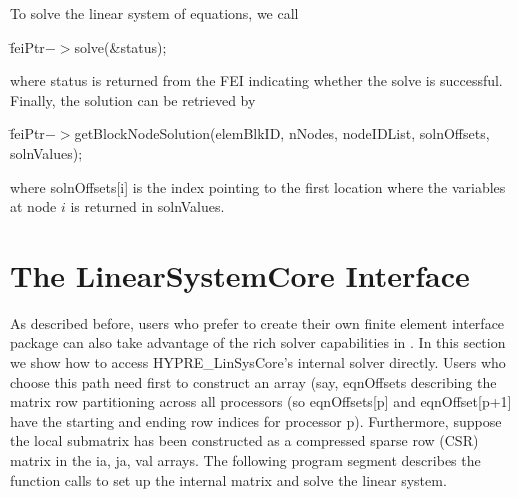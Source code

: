 To solve the linear system of equations, we call
\begin{tabbing}
\hspace{0.5in} \= {\sf feiPtr$->$solve(\&status);}
\end{tabbing}
where {\sf status} is returned from the {\sf FEI} indicating whether
the solve is successful. Finally, the solution can be retrieved by
\begin{tabbing}
\hspace{0.5in} \= {\sf feiPtr$->$getBlockNodeSolution(elemBlkID, nNodes, nodeIDList, solnOffsets, solnValues);}
\end{tabbing}
where {\sf solnOffsets[i]} is the index pointing to the first location 
where the variables at node $i$ is returned in {\sf solnValues}.

\section{The LinearSystemCore Interface}

As described before, users who prefer to create their own finite element
interface package can also take advantage of the rich solver capabilities
in \hypre{}. In this section we show how to access {\sf HYPRE\_LinSysCore}'s
internal solver directly.  Users who choose this path need first to 
construct an array (say, {\sf eqnOffsets} describing the matrix row
partitioning across all processors (so {\sf eqnOffsets[p]} and
{\sf eqnOffset[p+1]} have the starting and ending row indices for processor
p). Furthermore, suppose the local submatrix has been constructed as a
compressed sparse row (CSR) matrix in the {\sf ia, ja, val} arrays. 
The following program segment describes the function calls to set up
the internal matrix and solve the linear system.

